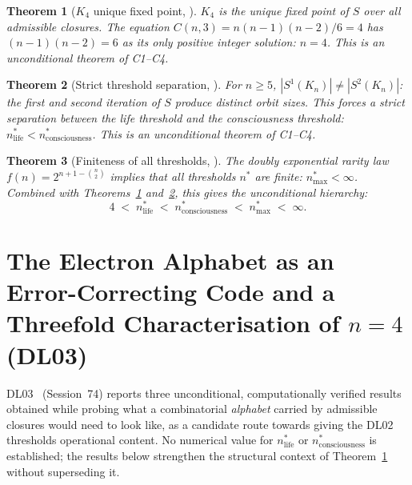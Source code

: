 \documentclass[11pt,a4paper]{article}
\theoremstyle{plain}
\newtheorem{theorem}{Theorem}[section]
\theoremstyle{definition}
\theoremstyle{remark}
\begin{document}
\begin{theorem}[$K_4$ unique fixed point, \cite{DL02}]
\label{thm:DL02_unique}
$K_4$ is the unique fixed point of $S$ over all admissible closures. The equation $C(n,3) = n(n-1)(n-2)/6 = 4$ has $(n-1)(n-2) = 6$ as its only positive integer solution: $n = 4$. This is an unconditional theorem of C1--C4.
\end{theorem}

\begin{theorem}[Strict threshold separation, \cite{DL02}]
\label{thm:DL02_separation}
For $n \geq 5$, $|S^1(K_n)| \neq |S^2(K_n)|$: the first and second iteration of $S$ produce distinct orbit sizes. This forces a strict separation between the life threshold and the consciousness threshold: $n^*_{\mathrm{life}} < n^*_{\mathrm{consciousness}}$. This is an unconditional theorem of C1--C4.
\end{theorem}

\begin{theorem}[Finiteness of all thresholds, \cite{DL02}]
\label{thm:DL02_finiteness}
The doubly exponential rarity law $f(n) = 2^{n+1-\binom{n}{2}}$ implies that all thresholds $n^*$ are finite: $n^*_{\mathrm{max}} < \infty$. Combined with Theorems~\ref{thm:DL02_unique} and~\ref{thm:DL02_separation}, this gives the unconditional hierarchy:
\begin{equation}
4 \;<\; n^*_{\mathrm{life}} \;<\; n^*_{\mathrm{consciousness}} \;<\; n^*_{\mathrm{max}} \;<\; \infty.
\end{equation}
\end{theorem}

\section{The Electron Alphabet as an Error-Correcting Code and a Threefold Characterisation of \texorpdfstring{$n=4$}{n=4} (DL03)}
\label{sec:DL03}

DL03~\cite{DL03} (Session~74) reports three unconditional, computationally verified results obtained while probing what a combinatorial \emph{alphabet} carried by admissible closures would need to look like, as a candidate route towards giving the DL02 thresholds operational content. No numerical value for $n^*_{\mathrm{life}}$ or $n^*_{\mathrm{consciousness}}$ is established; the results below strengthen the structural context of Theorem~\ref{thm:DL02_unique} without superseding it.
\end{document}

